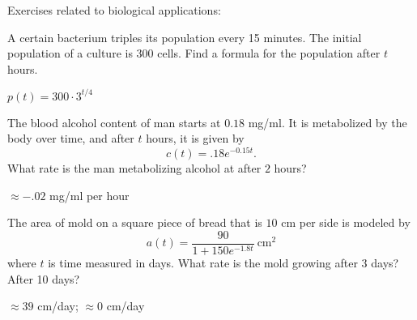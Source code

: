 \begin{exercises}
\noindent Exercises related to biological applications:

\begin{exercise}
A certain bacterium triples its population every 15 minutes. The
initial population of a culture is 300 cells. Find a formula for the
population after $t$ hours. 
\begin{answer}
$p(t) = 300\cdot3^{t/4}$
\end{answer}
\end{exercise}

\begin{exercise}
The blood alcohol content of man starts at $0.18$ mg/ml. It is metabolized by the body over time, and after $t$ hours, it is given by
\[
c(t) = .18e^{-0.15 t}.
\]
What rate is the man metabolizing alcohol at after $2$ hours?
\begin{answer}
$\approx -.02$ mg/ml per hour
\end{answer}
\end{exercise}

\begin{exercise}
The area of mold on a square piece of bread that is $10$ cm per side
is modeled by
\[
a(t) = \frac{90}{1+150e^{-1.8 t}}~\text{cm}^2
\]
where $t$ is time measured in days. What rate is the mold growing after 3 days? After 10 days?
\begin{answer}
$\approx 39$ cm/day; $\approx 0$ cm/day
\end{answer}
\end{exercise}






\end{exercises}







